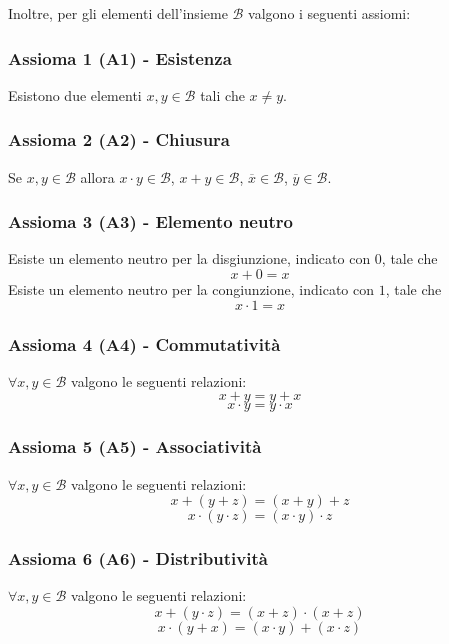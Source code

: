 \documentclass[a4paper]{extarticle}
\begin{document}
\noindent
Inoltre, per gli elementi dell'insieme \(\mathcal{B}\) valgono i seguenti assiomi:

\subsubsection{Assioma 1 (A1) - Esistenza}
Esistono due elementi \(x, y \in \mathcal{B}\) tali che \(x \neq y\).

\subsubsection{Assioma 2 (A2) - Chiusura}
Se \(x, y \in \mathcal{B}\) allora \hspace{1em} \(x \cdot y \in \mathcal{B}\), \hspace{1em} \(x + y \in \mathcal{B}\), \hspace{1em} \(\overline{x} \in \mathcal{B}\), \hspace{1em} \(\overline{y} \in \mathcal{B}\).

\subsubsection{Assioma 3 (A3) - Elemento neutro}
Esiste un elemento neutro per la disgiunzione, indicato con \(0\), tale che
\[x + 0 = x\]
Esiste un elemento neutro per la congiunzione, indicato con \(1\), tale che
\[x \cdot 1 = x\]

\subsubsection{Assioma 4 (A4) - Commutatività}
\(\forall x, y \in \mathcal{B}\) valgono le seguenti relazioni:
\[x + y = y + x\]
\[x \cdot y = y \cdot x\]

\subsubsection{Assioma 5 (A5) - Associatività}
\(\forall x, y \in \mathcal{B}\) valgono le seguenti relazioni:
\[x + (y + z) = (x + y) + z\]
\[x \cdot (y \cdot z) = (x \cdot y) \cdot z\]

\subsubsection{Assioma 6 (A6) - Distributività}
\(\forall x, y \in \mathcal{B}\) valgono le seguenti relazioni:
\[x + (y \cdot z) = (x+ z) \cdot (x + z)\]
\[x \cdot (y + x) = (x \cdot y) + (x \cdot z)\]
\end{document}
